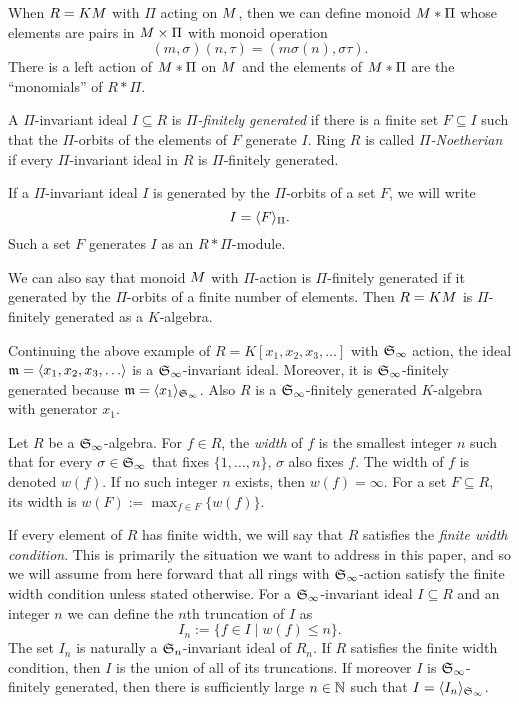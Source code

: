 When $R = KM$ with $\Pi$ acting on $M$, then we can define monoid $M *\Pi$ whose elements are pairs in $M \times \Pi$ with monoid operation
 \[ (m, \sigma)(n, \tau) = (m\sigma(n), \sigma\tau). \]
There is a left action of $M*\Pi$ on $M$ and the elements of $M *\Pi$ are the ``monomials'' of $R*\Pi$.

\begin{definition}
 A $\Pi$-invariant ideal $I \subseteq R$ is {\em $\Pi$-finitely generated} if there is a finite set $F \subseteq I$ such that the $\Pi$-orbits of the elements of $F$ generate $I$.  Ring $R$ is called {\em $\Pi$-Noetherian} if every $\Pi$-invariant ideal in $R$ is $\Pi$-finitely generated.
\end{definition}
If a $\Pi$-invariant ideal $I$ is generated by the $\Pi$-orbits of a set $F$, we will write
 \[ I = \langle F \rangle_{\Pi}. \]
Such a set $F$ generates $I$ as an $R*\Pi$-module.

We can also say that monoid $M$ with $\Pi$-action is $\Pi$-finitely generated if it generated by the $\Pi$-orbits of a finite number of elements.  Then $R = KM$ is $\Pi$-finitely generated as a $K$-algebra.

\begin{example}
 Continuing the above example of $R = K[x_1,x_2,x_3,\ldots]$ with $\mathfrak S_\infty$ action, the ideal $\mathfrak m = \langle x_1,x_2,x_3,\ldots \rangle$ is a $\mathfrak S_\infty$-invariant ideal.  Moreover, it is $\mathfrak S_\infty$-finitely generated because $\mathfrak m = \langle x_1 \rangle_{\mathfrak S_\infty}$.  Also $R$ is a $\mathfrak S_\infty$-finitely generated $K$-algebra with generator $x_1$.
\end{example}
 

\begin{definition}
 Let $R$ be a $\mathfrak S_\infty$-algebra.  For $f \in R$, the {\em width} of $f$ is the smallest integer $n$ such that for every $\sigma \in \mathfrak S_\infty$ that fixes $\{1,\ldots,n\}$, $\sigma$ also fixes $f$.  The width of $f$ is denoted $w(f)$.  If no such integer $n$ exists, then $w(f) = \infty$.  For a set $F \subseteq R$, its width is $w(F) := \max_{f \in F}\{w(f)\}$.
\end{definition}
If every element of $R$ has finite width, we will say that $R$ satisfies the {\em finite width condition}.  This is primarily the situation we want to address in this paper, and so we will assume from here forward that all rings with $\mathfrak S_\infty$-action satisfy the finite width condition unless stated otherwise.  For a $\mathfrak S_\infty$-invariant ideal $I \subseteq R$ and an integer $n$ we can define the $n$th truncation of $I$ as
 \[ I_n := \{ f \in I \mid w(f) \leq n \}. \]
The set $I_n$ is naturally a $\mathfrak S_n$-invariant ideal of $R_n$.  If $R$ satisfies the finite width condition, then $I$ is the union of all of its truncations.  If moreover $I$ is $\mathfrak S_\infty$-finitely generated, then there is sufficiently large $n \in \mathbb N$ such that $I = \langle I_n \rangle_{\mathfrak S_\infty}$.

